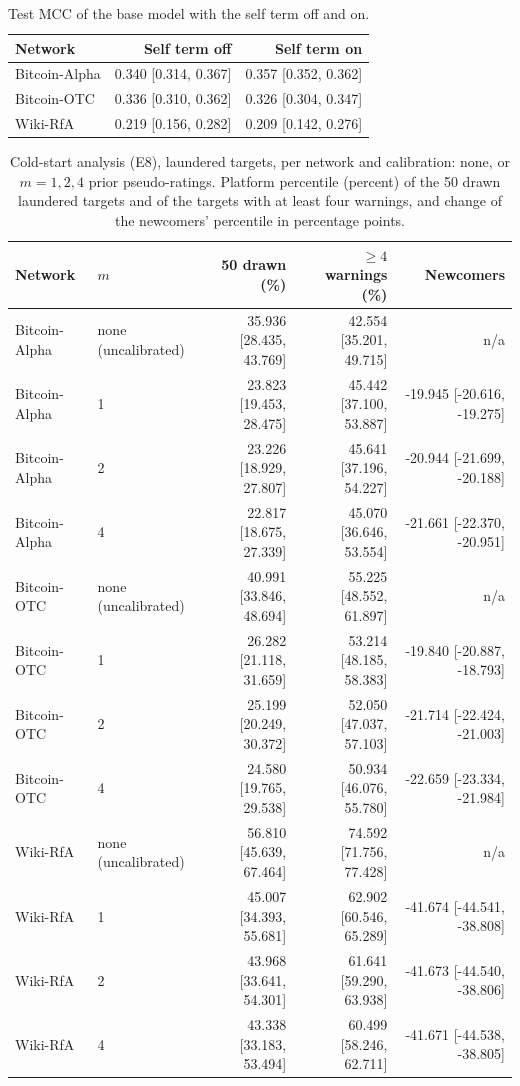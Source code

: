 \begin{table}[!t]
\centering
\scriptsize
\setlength{\tabcolsep}{3pt}
\caption{Test MCC of the base model with the self term off and on.}
\label{tab:s_s_self_term_mcc}
\begin{tabular}{@{}lrr@{}}
\toprule
\textbf{Network} & \textbf{Self term off} & \textbf{Self term on} \\
\midrule
Bitcoin-Alpha & 0.340 [0.314, 0.367] & 0.357 [0.352, 0.362] \\
Bitcoin-OTC & 0.336 [0.310, 0.362] & 0.326 [0.304, 0.347] \\
Wiki-RfA & 0.219 [0.156, 0.282] & 0.209 [0.142, 0.276] \\
\bottomrule
\end{tabular}
\end{table}

\begin{table}[!t]
\centering
\scriptsize
\setlength{\tabcolsep}{3pt}
\caption{Cold-start analysis (E8), laundered targets, per network and calibration: none, or $m = 1, 2, 4$ prior pseudo-ratings. Platform percentile (percent) of the 50 drawn laundered targets and of the targets with at least four warnings, and change of the newcomers' percentile in percentage points.}
\label{tab:s_s_self_term_e8_percentile}
\begin{tabular}{@{}llrrr@{}}
\toprule
\textbf{Network} & \textbf{$m$} & \textbf{50 drawn (\%)} & \textbf{$\ge 4$ warnings (\%)} & \textbf{Newcomers} \\
\midrule
Bitcoin-Alpha & none (uncalibrated) & 35.936 [28.435, 43.769] & 42.554 [35.201, 49.715] & n/a \\
Bitcoin-Alpha & 1 & 23.823 [19.453, 28.475] & 45.442 [37.100, 53.887] & -19.945 [-20.616, -19.275] \\
Bitcoin-Alpha & 2 & 23.226 [18.929, 27.807] & 45.641 [37.196, 54.227] & -20.944 [-21.699, -20.188] \\
Bitcoin-Alpha & 4 & 22.817 [18.675, 27.339] & 45.070 [36.646, 53.554] & -21.661 [-22.370, -20.951] \\
Bitcoin-OTC & none (uncalibrated) & 40.991 [33.846, 48.694] & 55.225 [48.552, 61.897] & n/a \\
Bitcoin-OTC & 1 & 26.282 [21.118, 31.659] & 53.214 [48.185, 58.383] & -19.840 [-20.887, -18.793] \\
Bitcoin-OTC & 2 & 25.199 [20.249, 30.372] & 52.050 [47.037, 57.103] & -21.714 [-22.424, -21.003] \\
Bitcoin-OTC & 4 & 24.580 [19.765, 29.538] & 50.934 [46.076, 55.780] & -22.659 [-23.334, -21.984] \\
Wiki-RfA & none (uncalibrated) & 56.810 [45.639, 67.464] & 74.592 [71.756, 77.428] & n/a \\
Wiki-RfA & 1 & 45.007 [34.393, 55.681] & 62.902 [60.546, 65.289] & -41.674 [-44.541, -38.808] \\
Wiki-RfA & 2 & 43.968 [33.641, 54.301] & 61.641 [59.290, 63.938] & -41.673 [-44.540, -38.806] \\
Wiki-RfA & 4 & 43.338 [33.183, 53.494] & 60.499 [58.246, 62.711] & -41.671 [-44.538, -38.805] \\
\bottomrule
\end{tabular}
\end{table}

